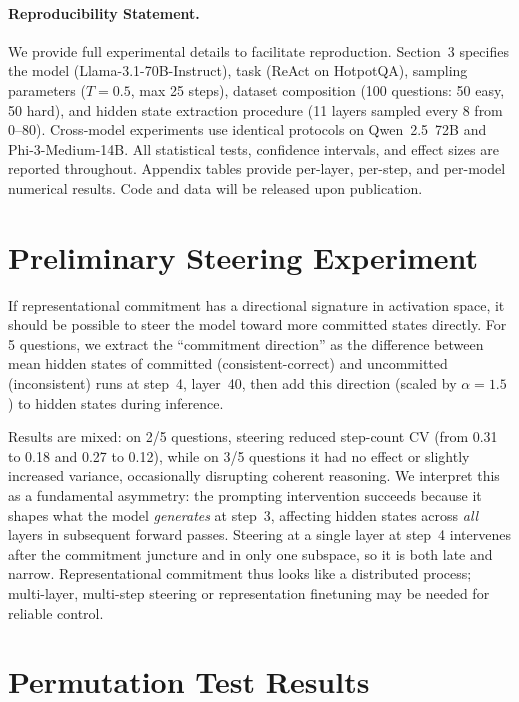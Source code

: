 \documentclass{article}
\begin{document}
\paragraph{Reproducibility Statement.} We provide full experimental details to facilitate reproduction. Section~3 specifies the model (Llama-3.1-70B-Instruct), task (ReAct on HotpotQA), sampling parameters ($T{=}0.5$, max 25 steps), dataset composition (100 questions: 50 easy, 50 hard), and hidden state extraction procedure (11 layers sampled every 8 from 0--80). Cross-model experiments use identical protocols on Qwen~2.5~72B and Phi-3-Medium-14B. All statistical tests, confidence intervals, and effect sizes are reported throughout. Appendix tables provide per-layer, per-step, and per-model numerical results. Code and data will be released upon publication.




\appendix

\section{Preliminary Steering Experiment}
\label{app:steering}

If representational commitment has a directional signature in activation space, it should be possible to steer the model toward more committed states directly. For 5 questions, we extract the ``commitment direction'' as the difference between mean hidden states of committed (consistent-correct) and uncommitted (inconsistent) runs at step~4, layer~40, then add this direction (scaled by $\alpha = 1.5$) to hidden states during inference.

Results are mixed: on 2/5 questions, steering reduced step-count CV (from 0.31 to 0.18 and 0.27 to 0.12), while on 3/5 questions it had no effect or slightly increased variance, occasionally disrupting coherent reasoning. We interpret this as a fundamental asymmetry: the prompting intervention succeeds because it shapes what the model \emph{generates} at step~3, affecting hidden states across \emph{all} layers in subsequent forward passes. Steering at a single layer at step~4 intervenes after the commitment juncture and in only one subspace, so it is both late and narrow. Representational commitment thus looks like a distributed process; multi-layer, multi-step steering \citep{zou2023repe} or representation finetuning may be needed for reliable control.

\section{Permutation Test Results}
\label{app:permutation}
\end{document}
